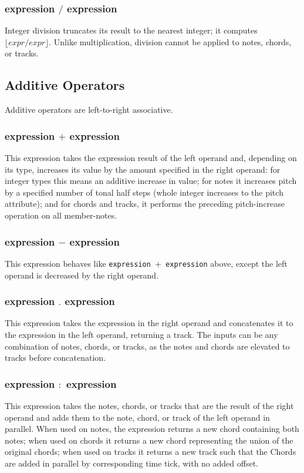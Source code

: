 \documentclass[letterpaper]{article}
\begin{document}
\subsubsection{expression $/$ expression}
Integer division truncates its result to the nearest integer; it computes $\lfloor{expr / expr}\rfloor$. Unlike multiplication, division cannot be applied to notes, chords, or tracks.

\subsection{Additive Operators}
Additive operators are left-to-right associative.

\subsubsection{expression $+$ expression}
This expression takes the expression result of the left operand and, depending on its type, increases its value by the amount specified in the right operand: for integer types this means an additive increase in value; for notes it increases pitch by a specified number of tonal half steps (whole integer increases to the pitch attribute); and for chords and tracks, it performs the preceding pitch-increase operation on all member-notes. 

\subsubsection{expression $-$ expression}
This expression behaves like \texttt{expression $+$ expression} above, except the  left operand is decreased by the right operand. 

\subsubsection{expression $.$ expression}
This expression takes the expression in the right operand and concatenates it to the expression in the left operand, returning a track. The inputs can be any combination of notes, chords, or tracks, as the notes and chords are elevated to tracks before concatenation.

\subsubsection{expression $:$ expression}
This expression takes the notes, chords, or tracks that are the result of the right operand and adds them to the note, chord, or track of the left operand in parallel. When used on notes, the expression returns a new chord containing both notes; when used on chords it returns a new chord representing the union of the original chords; when used on tracks it returns a new track such that the Chords are added in parallel by corresponding time tick, with no added offset. 
\end{document}
